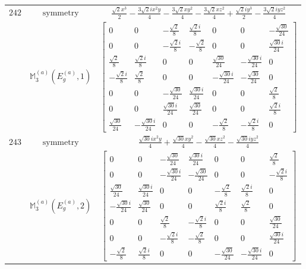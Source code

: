 \documentclass[fleqn,8pt,landscape]{jsarticle}
\begin{document}
\begin{longtable}{ccc}
$ 242 $ & $ \text{symmetry} $ & $ \frac{\sqrt{2} x^{3}}{2} - \frac{3 \sqrt{2} i x^{2} y}{4} - \frac{3 \sqrt{2} x y^{2}}{4} - \frac{3 \sqrt{2} x z^{2}}{4} + \frac{\sqrt{2} i y^{3}}{2} - \frac{3 \sqrt{2} i y z^{2}}{4} $ \\
$  $ & $ \mathbb{M}_{3}^{(a)}(E_{g}^{(a)},1) $ & $ \begin{bmatrix} 0 & 0 & - \frac{\sqrt{2}}{8} & \frac{\sqrt{2} i}{8} & 0 & 0 & - \frac{\sqrt{30}}{24} \\ 0 & 0 & - \frac{\sqrt{2} i}{8} & - \frac{\sqrt{2}}{8} & 0 & 0 & \frac{\sqrt{30} i}{24} \\ \frac{\sqrt{2}}{8} & \frac{\sqrt{2} i}{8} & 0 & 0 & \frac{\sqrt{30}}{24} & - \frac{\sqrt{30} i}{24} & 0 \\ - \frac{\sqrt{2} i}{8} & \frac{\sqrt{2}}{8} & 0 & 0 & - \frac{\sqrt{30} i}{24} & - \frac{\sqrt{30}}{24} & 0 \\ 0 & 0 & - \frac{\sqrt{30}}{24} & \frac{\sqrt{30} i}{24} & 0 & 0 & \frac{\sqrt{2}}{8} \\ 0 & 0 & \frac{\sqrt{30} i}{24} & \frac{\sqrt{30}}{24} & 0 & 0 & \frac{\sqrt{2} i}{8} \\ \frac{\sqrt{30}}{24} & - \frac{\sqrt{30} i}{24} & 0 & 0 & - \frac{\sqrt{2}}{8} & - \frac{\sqrt{2} i}{8} & 0 \end{bmatrix} $ \\ \hline
$ 243 $ & $ \text{symmetry} $ & $ \frac{\sqrt{30} i x^{2} y}{4} + \frac{\sqrt{30} x y^{2}}{4} - \frac{\sqrt{30} x z^{2}}{4} - \frac{\sqrt{30} i y z^{2}}{4} $ \\
$  $ & $ \mathbb{M}_{3}^{(a)}(E_{g}^{(a)},2) $ & $ \begin{bmatrix} 0 & 0 & - \frac{\sqrt{30}}{24} & \frac{\sqrt{30} i}{24} & 0 & 0 & \frac{\sqrt{2}}{8} \\ 0 & 0 & - \frac{\sqrt{30} i}{24} & - \frac{\sqrt{30}}{24} & 0 & 0 & - \frac{\sqrt{2} i}{8} \\ \frac{\sqrt{30}}{24} & \frac{\sqrt{30} i}{24} & 0 & 0 & - \frac{\sqrt{2}}{8} & \frac{\sqrt{2} i}{8} & 0 \\ - \frac{\sqrt{30} i}{24} & \frac{\sqrt{30}}{24} & 0 & 0 & \frac{\sqrt{2} i}{8} & \frac{\sqrt{2}}{8} & 0 \\ 0 & 0 & \frac{\sqrt{2}}{8} & - \frac{\sqrt{2} i}{8} & 0 & 0 & \frac{\sqrt{30}}{24} \\ 0 & 0 & - \frac{\sqrt{2} i}{8} & - \frac{\sqrt{2}}{8} & 0 & 0 & \frac{\sqrt{30} i}{24} \\ - \frac{\sqrt{2}}{8} & \frac{\sqrt{2} i}{8} & 0 & 0 & - \frac{\sqrt{30}}{24} & - \frac{\sqrt{30} i}{24} & 0 \end{bmatrix} $ \\ \hline

\end{longtable}
\end{document}
